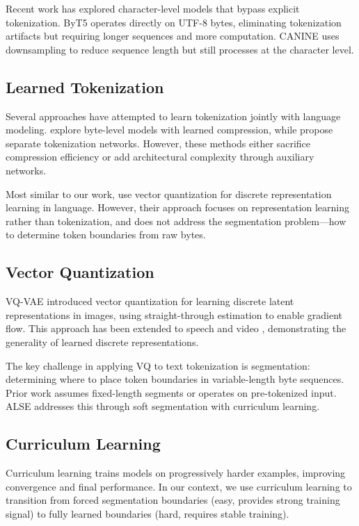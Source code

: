 \documentclass{article}
\begin{document}
Recent work has explored character-level models that bypass explicit tokenization. ByT5 \cite{xue2022byt5} operates directly on UTF-8 bytes, eliminating tokenization artifacts but requiring longer sequences and more computation. CANINE \cite{clark2022canine} uses downsampling to reduce sequence length but still processes at the character level.

\subsection{Learned Tokenization}

Several approaches have attempted to learn tokenization jointly with language modeling. \cite{chung2021byt5} explore byte-level models with learned compression, while \cite{wang2022tokenlearner} propose separate tokenization networks. However, these methods either sacrifice compression efficiency or add architectural complexity through auxiliary networks.

Most similar to our work, \cite{chirkova2021cpc} use vector quantization for discrete representation learning in language. However, their approach focuses on representation learning rather than tokenization, and does not address the segmentation problem—how to determine token boundaries from raw bytes.

\subsection{Vector Quantization}

VQ-VAE \cite{van2017vqvae} introduced vector quantization for learning discrete latent representations in images, using straight-through estimation to enable gradient flow. This approach has been extended to speech \cite{baevski2020wav2vec} and video \cite{yan2021videogpt}, demonstrating the generality of learned discrete representations.

The key challenge in applying VQ to text tokenization is segmentation: determining where to place token boundaries in variable-length byte sequences. Prior work assumes fixed-length segments or operates on pre-tokenized input. ALSE addresses this through soft segmentation with curriculum learning.

\subsection{Curriculum Learning}

Curriculum learning \cite{bengio2009curriculum} trains models on progressively harder examples, improving convergence and final performance. In our context, we use curriculum learning to transition from forced segmentation boundaries (easy, provides strong training signal) to fully learned boundaries (hard, requires stable training).
\end{document}
